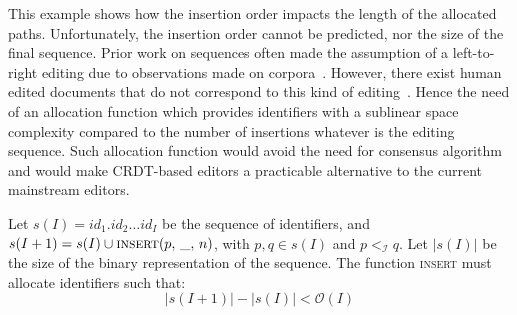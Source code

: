 This example shows how the insertion order impacts the length of the allocated
paths. Unfortunately, the insertion order cannot be predicted, nor the size of
the final sequence. Prior work on sequences often made the assumption of a
left-to-right editing due to observations made on
corpora~\cite{preguica2009commutative, weiss2009logoot}. However, there exist
human edited documents that do not correspond to this kind of
editing~\cite{nedelec2013lseq}.
Hence the need of an allocation function which provides identifiers with a
sublinear space complexity compared to the number of insertions whatever is the
editing sequence. Such allocation function would avoid the need for consensus
algorithm~\cite{mostefaoui2015signature} and would make CRDT-based editors a
practicable alternative to the current mainstream editors.

\begin{problem}
  Let $s(I)= id_1.id_2\ldots id_I$ be the sequence of identifiers, and
  $s(I+1) = s(I) \cup \textsc{insert}(p,\, \_,\, n)$, with $p,q \in s(I)$ and
  $p<_\mathcal{I}q$. Let $|s(I)|$ be the size of the binary representation of
  the sequence. The function \textsc{insert} must allocate identifiers such
  that:
  \begin{equation}
    |s(I+1)| - |s(I)| < \mathcal{O}(I)
  \end{equation}
\end{problem}

 

